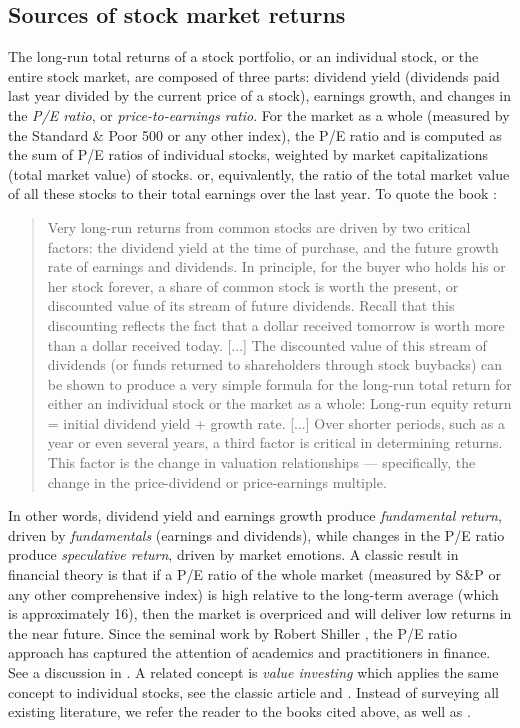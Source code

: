 \documentclass[12pt]{amsart}
\theoremstyle{definition}
\begin{document}
\subsection{Sources of stock market returns} The long-run total returns of a stock portfolio, or an individual stock, or the entire stock market, are composed of three parts: dividend yield (dividends paid last year divided by the current price of a stock), earnings growth, and changes in the {\it P/E ratio}, or {\it price-to-earnings ratio}. For the market as a whole (measured by the Standard \& Poor 500 or any other index), the P/E ratio and is computed as the sum of P/E ratios of individual stocks, weighted by market capitalizations (total market value) of stocks.  or, equivalently, the ratio of the total market value of all these stocks to their total earnings over the last year. To quote the book \cite[pp.324--325]{RW12}:

\begin{quote}
Very long-run returns from common stocks are driven by two critical factors: the dividend yield at the time of purchase, and the future growth rate of earnings and dividends. In principle, for the buyer who holds his or her stock forever, a share of common stock is worth the present, or discounted value of its stream of future dividends. Recall that this discounting reflects the fact that a dollar received tomorrow is worth more than a dollar received today. [...] The discounted value of this stream of dividends (or funds returned to shareholders through stock buybacks) can be shown to produce a very simple formula for the long-run total return for either an individual stock or the market as a whole: Long-run equity return = initial dividend yield + growth rate. [...] Over shorter periods, such as a year or even several years, a third factor is critical in determining returns. This factor is the change in valuation relationships --- specifically, the change in the price-dividend or price-earnings multiple. 
\end{quote}

In other words, dividend yield and earnings growth produce {\it fundamental return}, driven by {\it fundamentals} (earnings and dividends), while changes in the P/E ratio produce {\it speculative return}, driven by market emotions. A classic result in financial theory is that if a P/E ratio of the whole market (measured by S\&P or any other comprehensive index) is high relative to the long-term average (which is approximately 16), then the market is overpriced and will deliver low returns in the near future. Since the seminal work by Robert Shiller \cite{Shiller1998, ShillerBook}, the P/E ratio approach has captured the attention of academics and practitioners in finance. See a discussion in \cite[Chapter 11]{SiegelBook}. A related concept is {\it value investing} which applies the same concept to individual stocks, see the classic article \cite{FF1993} and \cite[Chapter 12]{SiegelBook}.  Instead of surveying all existing literature,  we refer the reader to the books \cite{RW12, ShillerBook, SiegelBook} cited above, as well as \cite{Arnott, JPMorgan, Acct, Ural, PE}. 
\end{document}
